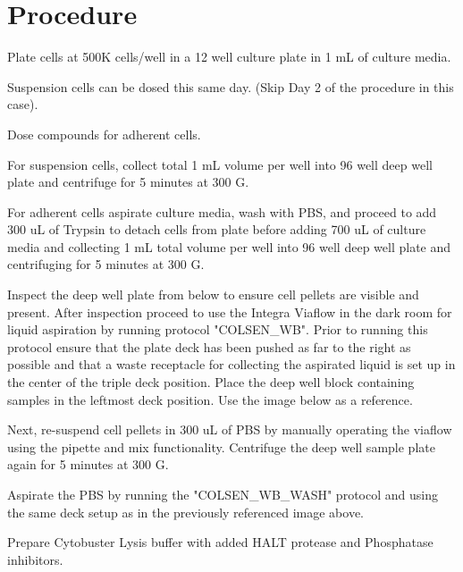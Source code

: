 \documentclass{protocols}
\begin{document}
	\section{Procedure}
	\begin{procedure}
	\item\begin{days}[Day 0]
			\item Plate cells at 500K cells/well in a 12 well culture plate in 1 mL of culture media.
			\item Suspension cells can be dosed this same day. (Skip Day 2 of the procedure in this case).
	\item\end{days}
		\begin{days}[Day 1]
			\item Dose compounds for adherent cells.
		\end{days}
		\begin{days}[Day 2]
			\item For suspension cells, collect total 1 mL volume per well into 96 well deep well plate and centrifuge for 5 minutes at 300 G.
			\item For adherent cells aspirate culture media, wash with PBS, and proceed to add 300 uL of Trypsin to detach cells from plate before adding 700 uL of culture media and collecting 1 mL total volume per well into 96 well deep well plate and centrifuging for 5 minutes at 300 G.
			\item Inspect the deep well plate from below to ensure cell pellets are visible and present. After inspection proceed to use the Integra Viaflow in the dark room for liquid aspiration by running protocol "COLSEN\_WB". Prior to running this protocol ensure that the plate deck has been pushed as far to the right as possible and that a waste receptacle for collecting the aspirated liquid is set up in the center of the triple deck position. Place the deep well block containing samples in the leftmost deck position. Use the image below as a reference.
			\newline
			\item Next, re-suspend cell pellets in 300 uL of PBS by manually operating the viaflow using the pipette and mix functionality. Centrifuge the deep well sample plate again for 5 minutes at 300 G.
			\item Aspirate the PBS by running the "COLSEN\_WB\_WASH" protocol and using the same deck setup as in the previously referenced image above.
			\item Prepare Cytobuster Lysis buffer with added HALT protease and Phosphatase inhibitors.

\end{days}
\end{procedure}
\end{document}
